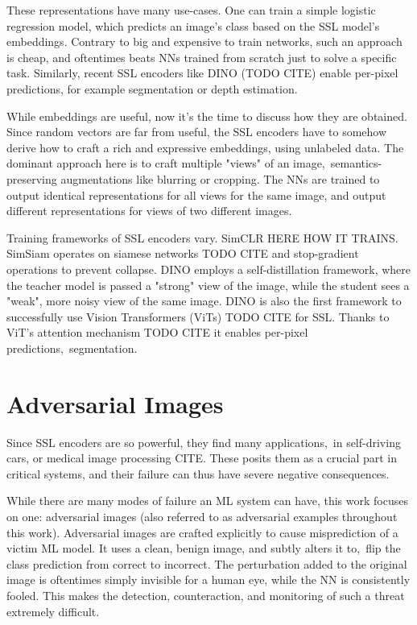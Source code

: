 These representations have many use-cases. One can train a simple logistic regression model, which predicts an image's class based on the SSL model's embeddings. Contrary to big and expensive to train networks, such an approach is cheap, and oftentimes beats NNs trained from scratch just to solve a specific task. Similarly, recent SSL encoders like DINO (TODO CITE) enable per-pixel predictions, for example segmentation or depth estimation. 

While embeddings are useful, now it's the time to discuss how they are obtained. Since random vectors are far from useful, the SSL encoders have to somehow derive how to craft a rich and expressive embeddings, using unlabeled data. The dominant approach here is to craft multiple "views" of an image,~\ie semantics-preserving augmentations like blurring or cropping. The NNs are trained to output identical representations for all views for the same image, and output different representations for views of two different images.

Training frameworks of SSL encoders vary. SimCLR HERE HOW IT TRAINS. SimSiam operates on siamese networks TODO CITE and stop-gradient operations to prevent collapse. DINO employs a self-distillation framework, where the teacher model is passed a "strong" view of the image, while the student sees a "weak", more noisy view of the same image. DINO is also the first framework to successfully use Vision Transformers (ViTs) TODO CITE for SSL. Thanks to ViT's attention mechanism TODO CITE it enables per-pixel predictions,~\eg segmentation.

\section{Adversarial Images}

Since SSL encoders are so powerful, they find many applications,~\eg in self-driving cars, or medical image processing CITE. These posits them as a crucial part in critical systems, and their failure can thus have severe negative consequences. 

While there are many modes of failure an ML system can have, this work focuses on one: adversarial images (also referred to as adversarial examples throughout this work). Adversarial images are crafted explicitly to cause misprediction of a victim ML model. It uses a clean, benign image, and subtly alters it to,~\eg flip the class prediction from correct to incorrect. The perturbation added to the original image is oftentimes simply invisible for a human eye, while the NN is consistently fooled. This makes the detection, counteraction, and monitoring of such a threat extremely difficult. 

